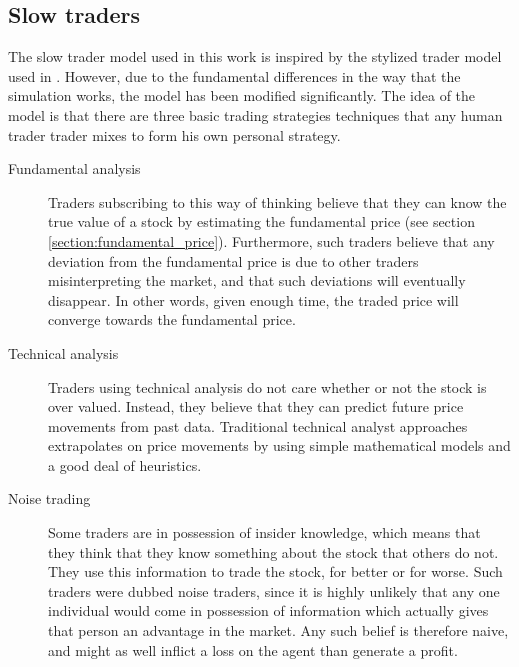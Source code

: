 \subsection{Slow traders}\label{section:slow_traders}
The slow trader model used in this work is inspired by the stylized trader model used in \cite{chiwang2013investigating, chiarella2009impact, gsell2008assessing}. However, due to the fundamental differences in the way that the simulation works, the model has been modified significantly. 
The idea of the model is that there are three basic trading strategies techniques that any human trader trader mixes to form his own personal strategy. 
\begin{description}
\item[Fundamental analysis] Traders subscribing to this way of thinking believe that they can know the true value of a stock by estimating the fundamental price (see section \ref{section:fundamental_price}). Furthermore, such traders believe that any deviation from the fundamental price is due to other traders misinterpreting the market, and that such deviations will eventually disappear. In other words, given enough time, the traded price will converge towards the fundamental price. 
\item[Technical analysis] Traders using technical analysis do not care whether or not the stock is over valued. Instead, they believe that they can predict future price movements from past data. Traditional technical analyst approaches extrapolates on price movements by using simple mathematical models and a good deal of heuristics.
\item[Noise trading] Some traders are in possession of insider knowledge, which means that they think that they know something about the stock that others do not. They use this information to trade the stock, for better or for worse. Such traders were dubbed noise traders, since it is highly unlikely that any one individual would come in possession of information which actually gives that person an advantage in the market. Any such belief is therefore naive, and might as well inflict a loss on the agent than generate a profit.
\end{description}

